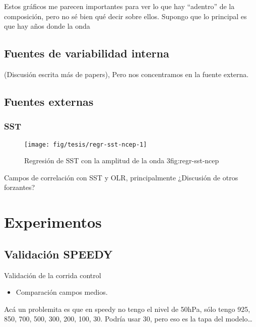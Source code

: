 \documentclass[spanish,a4paper]{book}
\providecommand{\tightlist}{%
  \setlength{\itemsep}{0pt}\setlength{\parskip}{0pt}}
\begin{document}
Estos gráficos me parecen importantes para ver lo que hay ``adentro'' de
la composición, pero no sé bien qué decir sobre ellos. Supongo que lo
principal es que hay años donde la onda

\section{Fuentes de variabilidad
interna}\label{fuentes-de-variabilidad-interna}

(Discusión escrita más de papers), Pero nos concentramos en la fuente
externa.

\section{Fuentes externas}\label{fuentes-externas}

\subsection{SST}\label{sst}

\begin{figure}

{\centering \texttt{[image: fig/tesis/regr-sst-ncep-1]} 

}

\caption{Regresión de SST con la amplitud de la onda 3{fig:regr-sst-ncep}}\label{fig:regr-sst-ncep}
\end{figure}

Campos de correlación con SST y OLR, principalmente ¿Discusión de otros
forzantes?

\chapter{Experimentos}\label{experimentos}

\section{Validación SPEEDY}\label{validacion-speedy}

Validación de la corrida control

\begin{itemize}
\tightlist
\item
  Comparación campos medios.
\end{itemize}

Acá un problemita es que en speedy no tengo el nivel de 50hPa, sólo
tengo 925, 850, 700, 500, 300, 200, 100, 30. Podría usar 30, pero eso es
la tapa del modelo\ldots{}
\end{document}
